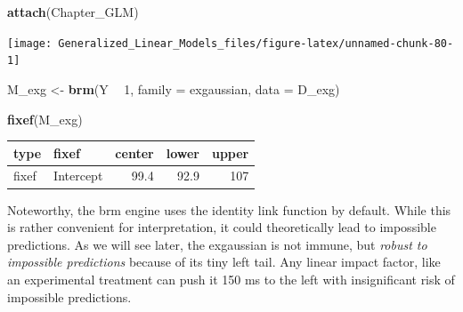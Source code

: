 \documentclass[]{svmono}
\newenvironment{Shaded}{\begin{snugshade}}{\end{snugshade}}
\newcommand{\KeywordTok}[1]{\textcolor[rgb]{0.13,0.29,0.53}{\textbf{#1}}}
\newcommand{\DataTypeTok}[1]{\textcolor[rgb]{0.13,0.29,0.53}{#1}}
\newcommand{\DecValTok}[1]{\textcolor[rgb]{0.00,0.00,0.81}{#1}}
\newcommand{\StringTok}[1]{\textcolor[rgb]{0.31,0.60,0.02}{#1}}
\newcommand{\OperatorTok}[1]{\textcolor[rgb]{0.81,0.36,0.00}{\textbf{#1}}}
\newcommand{\NormalTok}[1]{#1}
\begin{document}
\begin{Shaded}
\begin{Highlighting}[]
\KeywordTok{attach}\NormalTok{(Chapter_GLM)}
\end{Highlighting}
\end{Shaded}

\begin{Shaded}
\end{Shaded}

\texttt{[image: Generalized\_Linear\_Models\_files/figure-latex/unnamed-chunk-80-1]}

\begin{Shaded}
\begin{Highlighting}[]
\NormalTok{M_exg <-}\StringTok{ }\KeywordTok{brm}\NormalTok{(Y }\OperatorTok{~}\StringTok{ }\DecValTok{1}\NormalTok{,}
             \DataTypeTok{family =}\NormalTok{ exgaussian,}
             \DataTypeTok{data =}\NormalTok{ D_exg)}
\end{Highlighting}
\end{Shaded}

\begin{Shaded}
\begin{Highlighting}[]
\KeywordTok{fixef}\NormalTok{(M_exg)}
\end{Highlighting}
\end{Shaded}

\begin{longtable}[]{@{}llrrr@{}}
\toprule
type & fixef & center & lower & upper\tabularnewline
\midrule
\endhead
fixef & Intercept & 99.4 & 92.9 & 107\tabularnewline
\bottomrule
\end{longtable}

Noteworthy, the brm engine uses the identity link function by default.
While this is rather convenient for interpretation, it could
theoretically lead to impossible predictions. As we will see later, the
exgaussian is not immune, but \emph{robust to impossible predictions}
because of its tiny left tail. Any linear impact factor, like an
experimental treatment can push it 150 ms to the left with insignificant
risk of impossible predictions.
\end{document}

